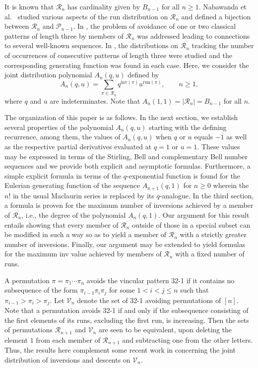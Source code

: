 \documentclass[11pt,a4paper]{article}
\begin{document}
It is known that $\mathcal{R}_n$ has cardinality given by $B_{n-1}$ for all $n \geq 1$. Nabawanda et al.\ \cite{NRB} studied various aspects of the run distribution on $\mathcal{R}_n$ and defined a bijection between $\mathcal{R}_n$ and $\mathcal{P}_{n-1}$.  In \cite{NR}, the problem of avoidance of one or two classical patterns of length three by members of $\mathcal{R}_n$ was addressed leading to connections to several well-known sequences.  In \cite{MSh}, the distributions on $\mathcal{R}_n$ tracking the number of occurrences of consecutive patterns of length three were studied and the corresponding generating function was found in each case.  Here, we consider the joint distribution polynomial $A_n(q,u)$ defined by
\begin{equation}\label{Anqdef}
A_n(q,u)=\sum_{\pi \in \mathcal{R}_n}q^{\text{inv}(\pi)}u^{\text{run}(\pi)}, \qquad n \geq 1,
\end{equation}
where $q$ and $u$ are indeterminates.  Note that $A_{n}(1,1)=|\mathcal{R}_{n}|=B_{n-1}$ for all $n$.

The organization of this paper is as follows. In the next section, we establish several properties of the polynomial $A_n(q,u)$ starting with the defining recurrence, among them, the values of $A_n(q,u)$ when $q$ or $u$ equals $-1$ as well as the respective partial derivatives evaluated at $q=1$ or $u=1$.  These values may be expressed in terms of the Stirling, Bell and complementary Bell number sequences and we provide both explicit and asymptotic formulas.  Furthermore, a simple explicit formula in terms of the $q$-exponential function is found for the Eulerian generating function of the sequence $A_{n+1}(q,1)$ for $n\geq0$ wherein the $n!$ in the usual Maclaurin series is replaced by its $q$-analogue. In the third section, a formula is proven for the maximum number of inversions achieved by a member of $\mathcal{R}_n$, i.e., the degree of the polynomial $A_n(q,1)$. Our argument for this result entails showing that every member of $\mathcal{R}_n$ outside of those in a special subset can be modified in such a way so as to yield a member of $\mathcal{R}_n$ with a strictly greater number of inversions.  Finally, our argument may be extended to yield formulas for the maximum inv value achieved by members of $\mathcal{R}_n$ with a fixed number of runs.

A permutation $\pi=\pi_1\cdots \pi_n$ avoids the vincular pattern 32-1 if it contains no subsequence of the form $\pi_{i-1}\pi_i\pi_j$ for some $1<i< j\leq n$ such that $\pi_{i-1}>\pi_i>\pi_j$.  Let $\mathcal{V}_n$ denote the set of 32-1 avoiding permutations of $[n]$.  Note that a permutation avoids 32-1 if and only if the subsequence consisting of the first elements of its runs, excluding the first run, is increasing. Then the sets of permutations $\mathcal{R}_{n+1}$ and $\mathcal{V}_n$ are seen to be equivalent, upon deleting the element $1$ from each member of $\mathcal{R}_{n+1}$ and subtracting one from the other letters. Thus, the results here complement some recent work in \cite{Bev,QP} concerning the joint distribution of inversions and descents on $\mathcal{V}_n$.
\end{document}
